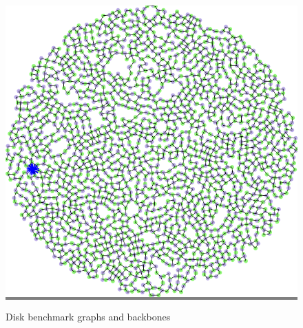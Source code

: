 \documentclass{article}
\begin{document}
\begin{figure}
\begin{minipage}{0.3\textwidth}
    \end{minipage}
    \hspace{\fill}
    \begin{minipage}{0.3\textwidth}
    \colorbox{gray}{\includegraphics[width=\linewidth]{./images/disk_2_bb_1.png}}
    \end{minipage}
    \vskip 0.1in

    \caption{Disk benchmark graphs and backbones}
    \label{disks}
\end{figure}

\end{document}

